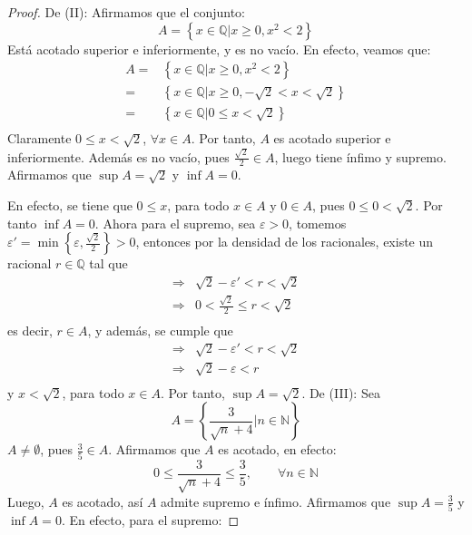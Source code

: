 \documentclass[12pt]{article}
\begin{document}
\begin{enumerate}
\begin{proof}
        De (II): Afirmamos que el conjunto:
        \begin{equation*}
            A = \left\{x\in\mathbb{Q}|x\geq0, x^2<2\right\}
        \end{equation*}
        Está acotado superior e inferiormente, y es no vacío. En efecto, veamos que:
        \begin{equation*}
            \begin{split}
                A=&\left\{x\in\mathbb{Q}|x\geq0, x^2<2\right\}\\
                =&\left\{x\in\mathbb{Q}|x\geq0, -\sqrt{2}<x<\sqrt{2}\right\}\\
                =&\left\{x\in\mathbb{Q}|0\leq x<\sqrt{2}\right\}\\
            \end{split}
        \end{equation*}
        Claramente $0\leq x <\sqrt{2}$, $\forall x\in A$. Por tanto, $A$ es acotado superior e inferiormente. Además es no vacío, pues $\frac{\sqrt{2}}{2}\in A$, luego tiene ínfimo y supremo. Afirmamos que $\sup A=\sqrt{2}$ y $\inf A = 0$.

        En efecto, se tiene que $0\leq x$, para todo $x\in A$ y $0\in A$, pues $0\leq 0<\sqrt{2}$. Por tanto $\inf A = 0$. Ahora para el supremo, sea $\varepsilon > 0$, tomemos $\varepsilon'=\min\left\{\varepsilon, \frac{\sqrt{2}}{2}\right\}>0$, entonces por la densidad de los racionales, existe un racional $r\in\mathbb{Q}$ tal que
        \begin{equation*}
            \begin{split}
                \Rightarrow &\sqrt{2}-\varepsilon'<r<\sqrt{2}\\
                \Rightarrow &0<\frac{\sqrt{2}}{2}\leq r<\sqrt{2}\\
            \end{split}
        \end{equation*}
        es decir, $r\in A$, y además, se cumple que
        \begin{equation*}
            \begin{split}
                \Rightarrow &\sqrt{2}-\varepsilon'<r<\sqrt{2}\\
                \Rightarrow &\sqrt{2}-\varepsilon<r\\
            \end{split}
        \end{equation*}
        y $x<\sqrt{2}$, para todo $x\in A$. Por tanto, $\sup A = \sqrt{2}$.
        De (III): Sea
        \begin{equation*}
            A = \left\{\frac{3}{\sqrt{n}+4}|n\in\mathbb{N}\right\}
        \end{equation*}
        $A\neq \emptyset$, pues $\frac{3}{5}\in A$. Afirmamos que $A$ es acotado, en efecto:
        \begin{equation*}
            0\leq \frac{3}{\sqrt{n}+4}\leq \frac{3}{5},\qquad\forall n\in\mathbb{N}
        \end{equation*}
        Luego, $A$ es acotado, así $A$ admite supremo e ínfimo. Afirmamos que $\sup A = \frac{3}{5}$ y $\inf A = 0$. En efecto, para el supremo:


\end{proof}
\end{enumerate}
\end{document}
